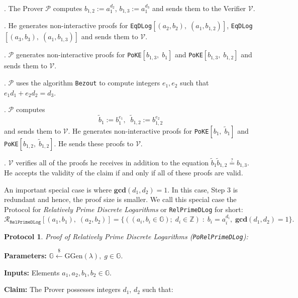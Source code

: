 \documentclass[11pt, lettersize, notitlepage, leqno, footskip=0.6cm]{article}
\newcommand{\bz}{\mathbb Z}
\newcommand{\ttt}{\texttt}
\newcommand{\wti}{\widetilde}
\newcommand{\mc}{\mathcal}
\newcommand{\mb}{\mathbb}
\newcommand{\mbf}{\mathbf}
\newcommand{\mr}{\mathrm}
\newcommand{\lamb}{\lambda}
\newcommand{\V}{\mc{V}}
\newcommand{\vs}{\vspace{-0.15cm}}
\newcommand{\GCD}{\mbf{gcd}}
\newtheorem{Prot}[Thm]{Protocol}
\numberwithin{equation}{section}
\begin{document}
\begin{prf1} . The Prover $\mc{P}$ computes $b_{1,2}:= a_1^{d_2}$, $b_{1,3}:= a_1^{d_3}$ and sends them to the Verifier $\V$.

. He generates non-interactive proofs for \verb|EqDLog|$[(a_2, b_2),\; (a_1, b_{1,2})]$, \verb|EqDLog|$[(a_3, b_3),\; (a_1, b_{1,3})]$ and sends them to $\mc{V}$.

. $\mc{P}$ generates non-interactive proofs for \verb|PoKE|$[b_{1,3},\;b_1 ]$ and \verb|PoKE|$[b_{1,3},\;b_{1,2} ]$ and sends them to $\V$.

. $\mc{P}$ uses the algorithm \verb|Bezout|  to compute integers $e_1, e_2$ such that $e_1d_1 + e_2d_2 = d_3$.

. $\mc{P}$ computes \vs $$\wti{b}_1:= b_1^{e_1},\;\; \wti{b}_{1,2}:= b_{1,2}^{e_2} $$ and sends them to $\V$. He generates non-interactive proofs for \verb|PoKE|$[b_1,\; \wti{b}_1]$ and \verb|PoKE|$[b_{1,2},\; \wti{b}_{1,2}]$. He sends these proofs to $\mc{V}$.

. $\mc{V}$ verifies all of the proofs he receives in addition to the equation $\wti{b}_1\wti{b}_{1,2}\stackrel{?}{=} b_{1,3}$. He accepts the validity of the claim if and only if all of these proofs are valid.\end{prf1}

\noindent An important special case is where $\GCD(d_1, d_2) = 1$. In this case, Step 3 is redundant and hence, the proof size is smaller. We call this special case the Protocol for \textit{Relatively Prime Discrete Logarithms} or \verb|RelPrimeDLog| for short: $$\mc{R}_{{\ttt{RelPrimeDLog}}}[(a_1,b_1),\;(a_2,b_2)] = \{((a_i, b_i\in\mb{G});\;d_i\in\bz)\;:\; b_i = a_i^{d_i},\;\GCD(d_1,d_2)=1 \} .$$ 

\vspace{0.1cm}

\begin{Prot} \normalfont \textit{Proof of Relatively Prime Discrete Logarithms} (\verb|PoRelPrimeDLog|):\end{Prot} \vspace{-0.3cm}

\noindent \textbf{Parameters:} $\mb{G}\xleftarrow{\$} \mr{GGen}(\lamb), \; g\in \mb{G}$.

\noindent \textbf{Inputs:} Elements $a_1, a_2, b_1, b_2 \in \mb{G}$.

\noindent \textbf{Claim:} The Prover possesses integers $d_1$, $d_2$ such that:
\end{document}
